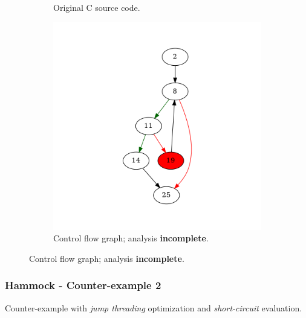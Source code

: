 \begin{figure}[htbp]
	\centering
	\begin{subfigure}[b]{0.48\textwidth}
		\centering
		
		\caption{Original C source code.}
	\end{subfigure}
	\begin{subfigure}[b]{0.50\textwidth}
		\centering
		\includegraphics[width=\textwidth]{inc/appendices/examples/hammock/counter-example/with-break/main_0001b.png}
		\caption{Control flow graph; analysis \textbf{incomplete}.}
	\end{subfigure}
\end{figure}


\clearpage

\subsubsection{Hammock - Counter-example 2}

Counter-example with \textit{jump threading} optimization and \textit{short-circuit} evaluation.

